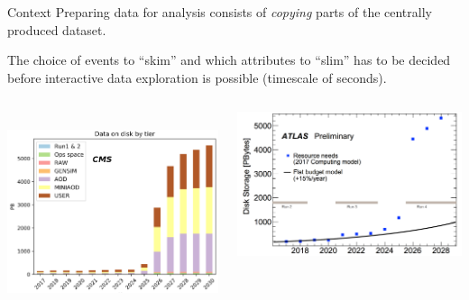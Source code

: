 \documentclass[aspectratio=169]{beamer}
\begin{document}
\begin{frame}{Context}
\vspace{0.5 cm}
Preparing data for analysis consists of {\it copying} parts of the centrally produced dataset.

\vspace{0.25 cm}
The choice of events to ``skim'' and which attributes to ``slim'' has to be decided before interactive data exploration is possible (timescale of seconds).

\vspace{0.5 cm}
\begin{columns}[c]
\mbox{ } \hfill \includegraphics[height=4.5 cm]{cms-data-explosion.png}


\vspace{0.2 cm}
\includegraphics[height=4.4 cm]{atlas-data-explosion.png} \hfill \mbox{ }
\end{columns}
\end{frame}
\end{document}
